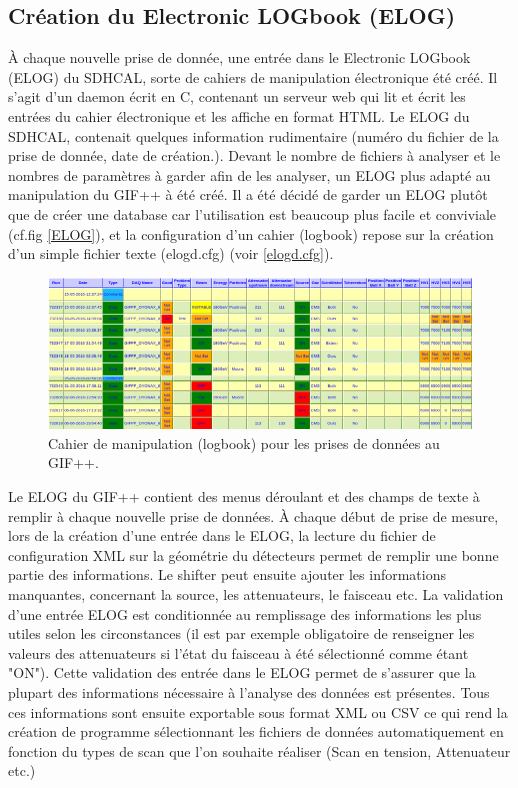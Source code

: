\subsection{Création du Electronic LOGbook (ELOG)}
À chaque nouvelle prise de donnée, une entrée dans le Electronic LOGbook (ELOG) \cite{ELOG} du SDHCAL, sorte de cahiers de manipulation électronique été créé. Il s'agit d'un daemon écrit en C, contenant un serveur web qui lit et écrit les entrées du cahier électronique et les affiche en format HTML. Le ELOG du SDHCAL, contenait quelques information rudimentaire (numéro du fichier de la prise de donnée, date de création.). Devant le nombre de fichiers à analyser et le nombres de paramètres à garder afin de les analyser, un ELOG plus adapté au manipulation du GIF++ à été créé. Il a été décidé de garder un ELOG plutôt que de créer une database car l'utilisation est beaucoup plus facile et conviviale (cf.fig \ref{ELOG}), et la configuration d'un cahier (logbook) repose sur la création d'un simple fichier texte (elogd.cfg) (voir \ref{elogd.cfg}). 
 
\begin{figure}[!ht]
	\centering
	\includegraphics[width=0.98\linewidth]{GLA/ELOG2.png}
	\caption{Cahier de manipulation (logbook) pour les prises de données au GIF++.}
	\label{ELOG2}
\end{figure}

Le ELOG du GIF++ contient des menus déroulant et des champs de texte à remplir à chaque nouvelle prise de données. À chaque début de prise de mesure, lors de la création d'une entrée dans le ELOG, la lecture du fichier de configuration XML sur la géométrie du détecteurs permet de remplir une bonne partie des informations. Le shifter peut ensuite ajouter les informations manquantes, concernant la source, les attenuateurs, le faisceau etc. La validation d'une entrée ELOG est conditionnée au remplissage des informations les plus utiles selon les circonstances (il est par exemple obligatoire de renseigner les valeurs des attenuateurs si l'état du faisceau à été sélectionné comme étant "ON"). Cette validation des entrée dans le ELOG permet de s'assurer que la plupart des informations nécessaire à l'analyse des données est présentes. Tous ces informations sont ensuite exportable sous format XML ou CSV ce qui rend la création de programme sélectionnant les fichiers de données automatiquement en fonction du types de scan que l'on souhaite réaliser (Scan en tension, Attenuateur etc.)


 
